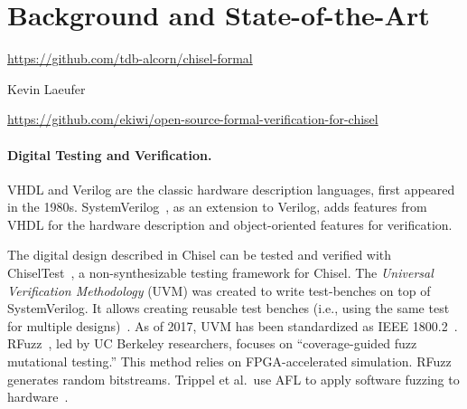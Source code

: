 \documentclass[fleqn,12pt]{article}
\begin{document}
\section{Background and State-of-the-Art}
\label{sec:background}

\url{https://github.com/tdb-alcorn/chisel-formal}

Kevin Laeufer

\url{https://github.com/ekiwi/open-source-formal-verification-for-chisel}



\paragraph{Digital Testing and Verification.}
VHDL and Verilog are the classic hardware description languages, first appeared in the 1980s.
SystemVerilog~\cite{SystemVerilog}, as an extension to Verilog, adds features from VHDL
for the hardware description and object-oriented features for verification.

The digital design described in Chisel can be tested and verified with
ChiselTest~\cite{chisel:tester2}, a non-synthesizable testing framework for Chisel.
The \textit{Universal Verification Methodology} (UVM) was created to write test-benches on top of SystemVerilog. 
It allows creating reusable test benches (i.e., using the same test for multiple designs)~\cite{uvm2015b}.
As of 2017, UVM has been standardized as IEEE 1800.2~\cite{IEEE:18002}.
RFuzz~\cite{rfuzz2018}, led by UC Berkeley researchers, focuses on ``coverage-guided fuzz mutational testing.''
This method relies on FPGA-accelerated simulation.
RFuzz generates random bitstreams.
Trippel et al.~use AFL to apply software fuzzing to hardware~\cite{DBLP:journals/corr/abs-2102-02308}.
\end{document}
